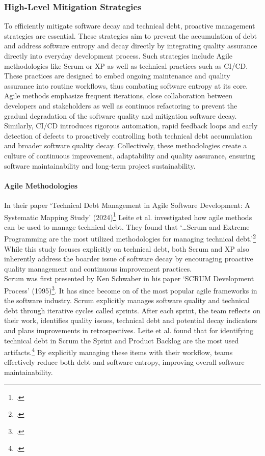 \subsubsection{High-Level Mitigation Strategies}
To efficiently mitigate software decay and technical debt, proactive management strategies are essential. These strategies aim to prevent the accumulation of 
debt and address software entropy and decay directly by integrating quality assurance directly into everyday development process.
Such strategies include Agile methodologies like Scrum or \ac{XP} as well as technical practices
such as \ac{CI/CD}. These practices are designed to embed ongoing maintenance and quality assurance into routine workflows, thus combating software entropy at its core.\\
Agile methods emphasize frequent iterations, close collaboration between developers and stakeholders as well as continuos refactoring to prevent the
gradual degradation of the software quality and mitigation software decay.\\
Similarly, \ac{CI/CD} introduces rigorous automation, rapid feedback loops and early detection of defects to proactively controlling both technical debt accumulation
and broader software quality decay. Collectively, these methodologies create a culture of continuous improvement, adaptability and quality assurance, 
ensuring software maintainability and long-term project sustainability.\\
\paragraph{Agile Methodologies}
In their paper `Technical Debt Management in Agile Software Development: A Systematic Mapping Study' (2024)\footcite{leiteTechnicalDebtManagement2024} Leite et al.
investigated how agile methods can be used to manage technical debt. They found that `\ldots Scrum and Extreme Programming are the most utilized methodologies 
for managing technical debt.'\footcite[318]{leiteTechnicalDebtManagement2024} While this study focuses explicitly on technical debt, both Scrum and \ac{XP}
also inherently address the boarder issue of software decay by encouraging proactive quality management and continuous improvement practices.\\
Scrum was first presented by Ken Schwaber in his paper `SCRUM Development Process' (1995)\footcite{schwaberSCRUMDevelopmentProcess1997}. 
It has since become on of the most popular agile frameworks in the software industry. Scrum explicitly manages software quality and technical debt through iterative cycles called sprints.
After each sprint, the team reflects on their work, identifies quality issues, technical debt and potential decay indicators and plans improvements in
retrospectives. Leite et al. found that for identifying technical debt in Scrum the Sprint and Product Backlog are the most used artifacts.\footcite[315]{leiteTechnicalDebtManagement2024}
By explicitly managing these items with their workflow, teams effectively reduce both debt and software entropy, improving overall software maintainability.\\


